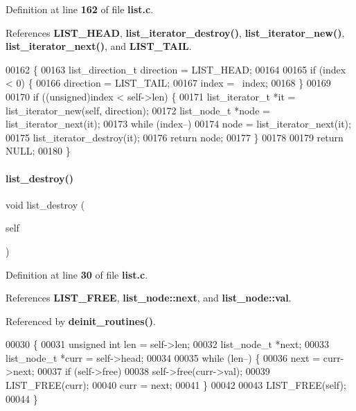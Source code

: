 Definition at line \textbf{ 162} of file \textbf{ list.\+c}.



References \textbf{ L\+I\+S\+T\+\_\+\+H\+E\+AD}, \textbf{ list\+\_\+iterator\+\_\+destroy()}, \textbf{ list\+\_\+iterator\+\_\+new()}, \textbf{ list\+\_\+iterator\+\_\+next()}, and \textbf{ L\+I\+S\+T\+\_\+\+T\+A\+IL}.


\begin{DoxyCode}
00162                                               \{
00163   list_direction_t direction = LIST_HEAD;
00164 
00165   \textcolor{keywordflow}{if} (index < 0) \{
00166     direction = LIST_TAIL;
00167     index = ~index;
00168   \}
00169 
00170   \textcolor{keywordflow}{if} ((\textcolor{keywordtype}{unsigned})index < self->len) \{
00171     list_iterator_t *it = list_iterator_new(\textcolor{keyword}{self}, direction);
00172     list_node_t *node = list_iterator_next(it);
00173     \textcolor{keywordflow}{while} (index--)
00174       node = list_iterator_next(it);
00175     list_iterator_destroy(it);
00176     \textcolor{keywordflow}{return} node;
00177   \}
00178 
00179   \textcolor{keywordflow}{return} NULL;
00180 \}
\end{DoxyCode}
\mbox{\label{a00110_ac2d2be572a896cccd0e76d56eeefcbdb}} 
\paragraph{list\+\_\+destroy()}
{\footnotesize\ttfamily void list\+\_\+destroy (\begin{DoxyParamCaption}\item[{\textbf{ list\+\_\+t} $\ast$}]{self }\end{DoxyParamCaption})}



Definition at line \textbf{ 30} of file \textbf{ list.\+c}.



References \textbf{ L\+I\+S\+T\+\_\+\+F\+R\+EE}, \textbf{ list\+\_\+node\+::next}, and \textbf{ list\+\_\+node\+::val}.



Referenced by \textbf{ deinit\+\_\+routines()}.


\begin{DoxyCode}
00030                                 \{
00031   \textcolor{keywordtype}{unsigned} \textcolor{keywordtype}{int} len = \textcolor{keyword}{self}->len;
00032   list_node_t *next;
00033   list_node_t *curr = \textcolor{keyword}{self}->head;
00034 
00035   \textcolor{keywordflow}{while} (len--) \{
00036     next = curr->next;
00037     \textcolor{keywordflow}{if} (self->free)
00038       \textcolor{keyword}{self}->free(curr->val);
00039     LIST_FREE(curr);
00040     curr = next;
00041   \}
00042 
00043   LIST_FREE(\textcolor{keyword}{self});
00044 \}
\end{DoxyCode}
\mbox{\label{a00110_a5d73352b7bfa0c5a8b33289d7b27a374}} 
